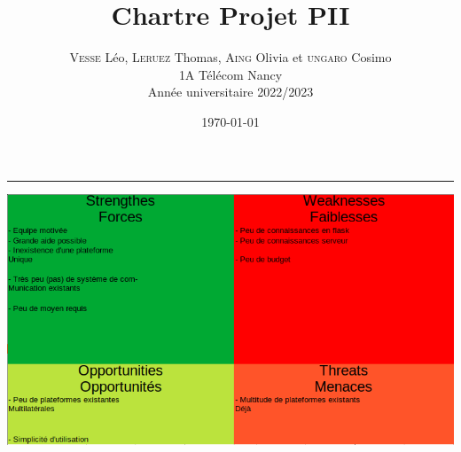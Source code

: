 \documentclass{report}
\begin{document}
\newcommand{\HRule}{\rule{\linewidth}{0.5mm}}
\newcommand{\blap}[1]{\vbox to 0pt{#1\vss}}
 
\title{\LARGE{Chartre Projet PII}}
\author{\textsc{Vesse} Léo, \textsc{Leruez} Thomas, \textsc{Aing} Olivia et \textsc{ungaro} Cosimo \\1A Télécom Nancy\\Année universitaire 2022/2023}
\date{\today}
\makeatletter
 

 
\begin{titlepage}
    \enlargethispage{2cm}
 
 
    \begin{center}
        \vspace*{10cm}
 
        \textsc{\@title}
        \HRule
        \vspace*{0.5cm}
 
        \large{\@author} 
    \end{center}
 
    \vspace*{9.2cm}
 
 
\end{titlepage}


\newpage






\includegraphics[scale=0.5]{images/SWOT.png}
\end{document}
